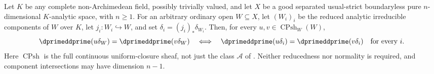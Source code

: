 \begin{corollary}
\label{cor:ch16-cpsh-component-curvature}
Let $K$ be any complete non-Archimedean field, possibly trivially valued,
and let $X$ be a good separated usual-strict boundaryless pure
$n$-dimensional $K$-analytic space, with $n\geq1$.
For an arbitrary ordinary open $W\subseteq X$, let $(W_i)_i$ be the
reduced analytic irreducible components of $W$ over $K$, let
$j_i:W_i\hookrightarrow W$, and set
$\delta_i=(j_i)_*\delta_{W_i}$.
Then, for every $u,v\in\operatorname{CPsh}_W(W)$,
\begin{equation}
 \dprimeddprime(u\delta_W)=\dprimeddprime(v\delta_W)
 \quad\Longleftrightarrow\quad
 \dprimeddprime(u\delta_i)=\dprimeddprime(v\delta_i)
 \quad\text{for every }i .
 \label{eq:ch16-cpsh-component-curvature}
\end{equation}
Here $\operatorname{CPsh}$ is the full continuous uniform-closure sheaf,
not just the class $\mathscr A$ of
.
Neither reducedness nor normality is required, and component
intersections may have dimension $n-1$.
\end{corollary}

